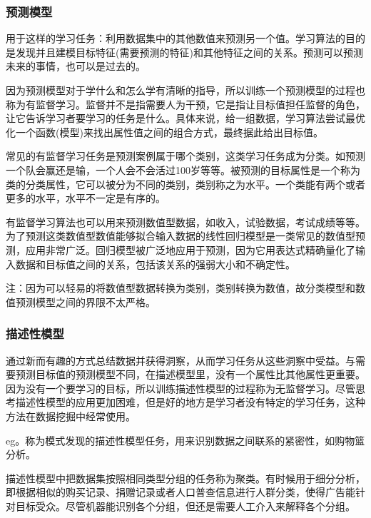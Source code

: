 \documentclass[11pt,a4paper,oneside]{book}
\begin{document}
\subsubsection{预测模型}
用于这样的学习任务：利用数据集中的其他数值来预测另一个值。学习算法的目的是发现并且建模目标特征(需要预测的特征)和其他特征之间的关系。预测可以预测未来的事情，也可以是过去的。

因为预测模型对于学什么和怎么学有清晰的指导，所以训练一个预测模型的过程也称为有监督学习。监督并不是指需要人为干预，它是指让目标值担任监督的角色，让它告诉学习者要学习的任务是什么。具体来说，给一组数据，学习算法尝试最优化一个函数(模型)来找出属性值之间的组合方式，最终据此给出目标值。

常见的有监督学习任务是预测案例属于哪个类别，这类学习任务成为分类。如预测一个队会赢还是输，一个人会不会活过100岁等等。被预测的目标属性是一个称为类的分类属性，它可以被分为不同的类别，类别称之为水平。一个类能有两个或者更多的水平，水平不一定是有序的。

有监督学习算法也可以用来预测数值型数据，如收入，试验数据，考试成绩等等。为了预测这类数值型数值能够拟合输入数据的线性回归模型是一类常见的数值型预测，应用非常广泛。回归模型被广泛地应用于预测，因为它用表达式精确量化了输入数据和目标值之间的关系，包括该关系的强弱大小和不确定性。

\begin{tcolorbox}[colback=pink!10!white,colframe=pink!100!black]
注：因为可以轻易的将数值型数据转换为类别，类别转换为数值，故分类模型和数值预测模型之间的界限不太严格。
\end{tcolorbox}

\subsubsection{描述性模型}
通过新而有趣的方式总结数据并获得洞察，从而学习任务从这些洞察中受益。与需要预测目标值的预测模型不同，在描述模型里，没有一个属性比其他属性更重要。因为没有一个要学习的目标，所以训练描述性模型的过程称为无监督学习。尽管思考描述性模型的应用更加困难，但是好的地方是学习者没有特定的学习任务，这种方法在数据挖掘中经常使用。

eg。称为模式发现的描述性模型任务，用来识别数据之间联系的紧密性，如购物篮分析。

描述性模型中把数据集按照相同类型分组的任务称为聚类。有时候用于细分分析，即根据相似的购买记录、捐赠记录或者人口普查信息进行人群分类，使得广告能针对目标受众。尽管机器能识别各个分组，但还是需要人工介入来解释各个分组。
\end{document}
